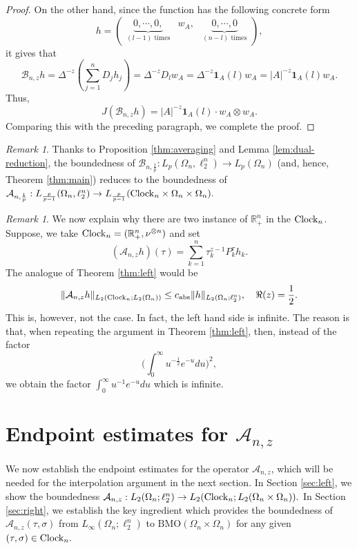 \documentclass{amsart}
\numberwithin{equation}{section}
\theoremstyle{definition}
\theoremstyle{remark}
\newtheorem{rem}[thm]{Remark}
\newcommand{\1}{\mathbf 1}
\newcommand{\BMO}{\mathrm{BMO}}
\begin{document}
\begin{proof}
On the other hand, since the function has the following concrete form
$$
h=
\begin{pmatrix}
\underbrace{0,\cdots,0,}_{(l-1)\mbox{ times}} & w_A, & \underbrace{0,\cdots,0}_{(n-l)\mbox{ times}}
\end{pmatrix},
$$
it gives that
$$\mathcal{B}_{n,z}h=\Delta^{-z}\left(\sum_{j=1}^nD_jh_j\right)=\Delta^{-z}D_lw_A=\Delta^{-z}\1_A(l)w_A=|A|^{-z}\1_A(l)w_A.$$
Thus,
$$J(\mathcal{B}_{n,z}h)=|A|^{-z}\1_A(l)\cdot w_A\otimes w_A.$$
Comparing this with the preceding paragraph, we complete the proof.
\end{proof}

\begin{rem}
Thanks to Proposition \ref{thm:averaging} and Lemma \ref{lem:dual-reduction}, the boundedness of $\mathcal{B}_{n,\frac1p}:L_p(\Omega_n,\ell_2^n)\to L_p(\Omega_n)$ (and, hence, Theorem \ref{thm:main}) reduces to the boundedness of $\mathcal{A}_{n,\frac1p}:L_{\frac{p}{p-1}}(\Omega_n,\ell_2^n)\to L_{\frac{p}{p-1}}({\rm Clock}_n\times\Omega_n\times\Omega_n).$
\end{rem}

\begin{rem}
We now explain why there are two instance of $\mathbb{R}^{n}_{+}$ in the ${\rm Clock}_{n}$. Suppose, we take ${\rm Clock}_n=(\mathbb{R}^n_+,\nu^{\otimes n})$ and set
$$(\mathcal{A}_{n,z}h)(\tau)=\sum_{k=1}^n\tau_k^{z-1}P_k^{\tau}h_k.$$
The analogue of Theorem \ref{thm:left} would be
$$\|\mathcal{A}_{n,z}h\|_{L_2({\rm Clock}_n;L_2(\Omega_n))}\leq c_{{\rm abs}}\|h\|_{L_2(\Omega_n;\ell_2^n)},\quad \Re(z)=\frac12.$$
This is, however, not the case. In fact, the left hand side is infinite. The reason is that, when repeating the argument in Theorem \ref{thm:left}, then, instead of the factor
$$\Big(\int_0^{\infty}u^{-\frac12}e^{-u}du\Big)^2,$$
we obtain the factor $\int_0^{\infty}u^{-1}e^{-u}du$ which is infinite.
\end{rem}

\section{Endpoint estimates for $\mathcal{A}_{n,z}$}\label{endpoint estimate section}

We now establish the endpoint estimates for the operator $\mathcal{A}_{n,z}$, which will be needed for the interpolation argument in the next section.
In Section \ref{sec:left}, we show the boundedness  $\mathcal{A}_{n,z}: L_2(\Omega_n; \ell_2^n)\to L_2({\rm Clock}_n;L_2(\Omega_n\times\Omega_n)).$ In Section \ref{sec:right}, we establish the key ingredient which provides the boundedness of $\mathcal{A}_{n,z}(\tau,\sigma)$ from $L_{\infty}(\Omega_n; \ell_2^n)$ to $\BMO(\Omega_n\times\Omega_n)$ for any given $(\tau,\sigma)\in{\rm Clock}_n.$
\end{document}

